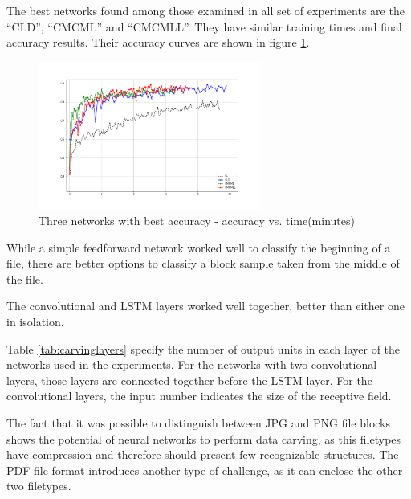 The best networks found among those examined in all set of experiments are the ``CLD'', ``CMCML'' and ``CMCMLL''. They have similar training times and final accuracy results. Their accuracy curves are shown in figure \ref{fig:bestnets}.

\begin{figure}[htb!]
\centering\includegraphics[width=0.65\textwidth]{content/CL-CLD-CMCML-CMCMLL.png}
\caption[Best networks]{\label{fig:bestnets}Three networks with best accuracy - accuracy vs. time(minutes)}
\end{figure}

While a simple feedforward network worked well to classify the beginning of a file, there are better options to classify a block sample taken from the middle of the file.

The convolutional and LSTM layers worked well together, better than either one in isolation.

Table \ref{tab:carvinglayers} specify the number of output units in each layer of the networks used in the experiments. For the networks with two convolutional layers, those layers are connected together before the LSTM layer. For the convolutional layers, the input number indicates the size of the receptive field. 


The fact that it was possible to distinguish between JPG and PNG file blocks shows the potential of neural networks to perform data carving, as this filetypes have compression and therefore should present few recognizable structures. The PDF file format introduces another type of challenge, as it can enclose the other two filetypes. 
